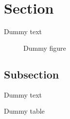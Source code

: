 \documentclass{article}
\begin{document}
	\tableofcontents
	\newpage
	
	\section{Section}

		Dummy text

		\begin{figure}[h!]
  			\caption{Dummy figure}
		\end{figure}


	\subsection{Subsection}

		Dummy text

		\begin{table}[h!]
  			\caption{Dummy table}
		\end{table}
		
	\newpage

	\begin{appendix}
  		\listoffigures
  		
  		\doublespacing
  		
  		\listoftables
	\end{appendix}
\end{document}
